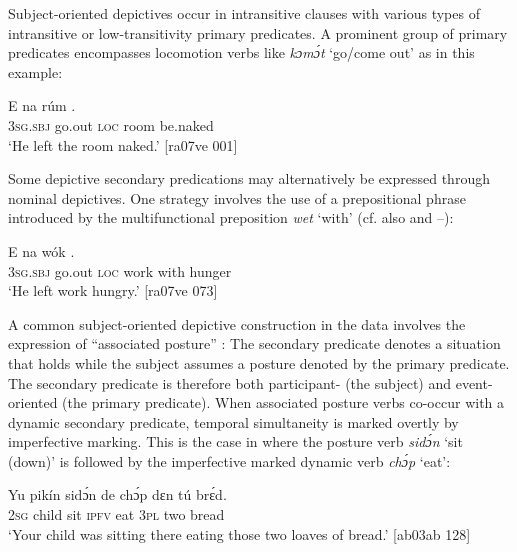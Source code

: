 Subject-oriented depictives occur in intransitive clauses with various types of intransitive or low-transitivity primary predicates. A prominent group of primary predicates encompasses locomotion verbs like \textit{kɔmɔ́t} ‘go/come out’ as in this example: 


\ea%
    \label{ex:key:1594}
    \gll E      na  rúm    .\\
\textsc{3sg.sbj}  go.out  \textsc{loc}  room  be.naked\\

\glt ‘He left the room naked.’ [ra07ve 001]
\z

Some depictive secondary predications may alternatively be expressed through nominal depictives. One strategy involves the use of a prepositional phrase introduced by the multifunctional preposition \textit{wet} ‘with’ (cf. also  and –): 


\ea%
    \label{ex:key:1595}
    \gll E      na  wók        .\\
\textsc{3sg.sbj}  go.out  \textsc{loc}  work  with    hunger\\

\glt ‘He left work hungry.’ [ra07ve 073]
\z

A common subject-oriented depictive construction in the data involves the expression of “associated posture” \citep{Enfield2002}: The secondary predicate denotes a situation that holds while the subject assumes a posture denoted by the primary predicate. The secondary predicate is therefore both participant- (the subject) and event-oriented (the primary predicate). When associated posture verbs co-occur with a dynamic secondary predicate, temporal simultaneity is marked overtly by imperfective marking. This is the case in  where the posture verb \textit{sidɔ́n} ‘sit (down)’ is followed by the imperfective marked dynamic verb \textit{chɔ́p} ‘eat’: 


\ea%
    \label{ex:key:1596}
    \gll Yu  pikín  sidɔ́n  de  chɔ́p  dɛn  tú  brɛ́d.\\
\textsc{2sg}  child  sit    \textsc{ipfv}  eat    \textsc{3pl}  two  bread\\

\glt ‘Your child was sitting there eating those two loaves of bread.’ [ab03ab 128]
\z


